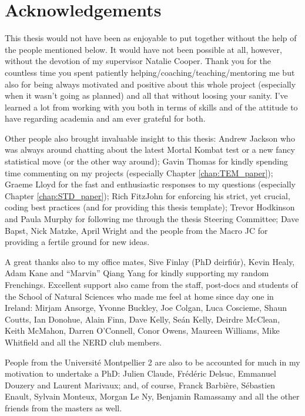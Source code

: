 \chapter*{Acknowledgements}

This thesis would not have been as enjoyable to put together without the help of the people mentioned below.
It would have not been possible at all, however, without the devotion of my supervisor Natalie Cooper.
Thank you for the countless time you spent patiently helping/coaching/teaching/mentoring me but also for being always motivated and positive about this whole project (especially when it wasn't going as planned) and all that without loosing your sanity.
I've learned a lot from working with you both in terms of skills and of the attitude to have regarding academia and am ever grateful for both.

Other people also brought invaluable insight to this thesis:
Andrew Jackson who was always around chatting about the latest Mortal Kombat test or a new fancy statistical move (or the other way around);
Gavin Thomas for kindly spending time commenting on my projects (especially Chapter \ref{chap:TEM_paper});
Graeme Lloyd for the fast and enthusiastic responses to my questions (especially Chapter \ref{chap:STD_paper});
Rich FitzJohn for enforcing his strict, yet crucial, coding best practices (and for providing this thesis template);
Trevor Hodkinson and Paula Murphy for following me through the thesis Steering Committee;
Dave Bapst, Nick Matzke, April Wright and the people from the Macro JC for providing a fertile ground for new ideas.

A great thanks also to my office mates, Sive Finlay (PhD deirfi\'{u}r), Kevin Healy, Adam Kane and ``Marvin'' Qiang Yang for kindly supporting my random Frenchings.
Excellent support also came from the staff, post-docs and students of the School of Natural Sciences who made me feel at home since day one in Ireland:
Mirjam Ansorge, Yvonne Buckley, Joe Colgan, Luca Coscieme, Shaun Coutts, Ian Donohue, Alain Finn, Dave Kelly, Se\'{a}n Kelly, Deirdre McClean, Keith McMahon, Darren O'Connell, Conor Owens, Maureen Williams, Mike Whitfield and all the NERD club members.

People from the Universit\'{e} Montpellier 2 are also to be accounted for much in my motivation to undertake a PhD: %
Julien Claude, Fr\'{e}d\'{e}ric Delsuc, Emmanuel Douzery and Laurent Marivaux;
and, of course, Franck Barbi\`{e}re, S\'{e}bastien Enault, Sylvain Monteux, Morgan Le Ny, Benjamin Ramassamy and all the other friends from the masters as well.

